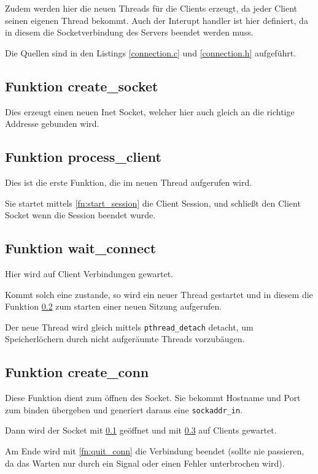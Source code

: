 \documentclass[pdftex,final,a4paper,10pt,notitlepage,halfparskip]{scrreprt}
\begin{document}
Zudem werden hier die neuen Threads für die Clients erzeugt, da jeder Client seinen eigenen Thread bekommt. Auch der Interupt handler ist hier definiert, da in diesem die Socketverbindung des Servers beendet werden muss.

Die Quellen sind in den Listings \ref{connection.c} und \ref{connection.h} aufgeführt.




\subsection{Funktion create\_socket}\label{fn:create_socket}
Dies erzeugt einen neuen Inet Socket, welcher hier auch gleich an die richtige Addresse gebunden wird.

\subsection{Funktion process\_client}\label{fn:process_client}
Dies ist die erste Funktion, die im neuen Thread aufgerufen wird.

Sie startet mittels \ref{fn:start_session} die Client Session, und schließt den Client Socket wenn die Session beendet wurde.

\subsection{Funktion wait\_connect}\label{fn:wait_connect}
Hier wird auf Client Verbindungen gewartet. 

Kommt solch eine zustande, so wird ein neuer Thread gestartet und in diesem die Funktion \ref{fn:process_client} zum starten einer neuen Sitzung aufgerufen.

Der neue Thread wird gleich mittels \texttt{pthread\_detach} detacht, um Speicherlöchern durch nicht aufgeräumte Threads vorzubäugen.

\subsection{Funktion create\_conn}\label{fn:create_conn}
Diese Funktion dient zum öffnen des Socket. Sie bekommt Hostname und Port zum binden übergeben und generiert daraus eine \texttt{sockaddr\_in}.

Dann wird der Socket mit \ref{fn:create_socket} geöffnet und mit \ref{fn:wait_connect} auf Clients gewartet.

Am Ende wird mit \ref{fn:quit_conn} die Verbindung beendet (sollte nie passieren, da das Warten nur durch ein Signal oder einen Fehler unterbrochen wird).
\end{document}
